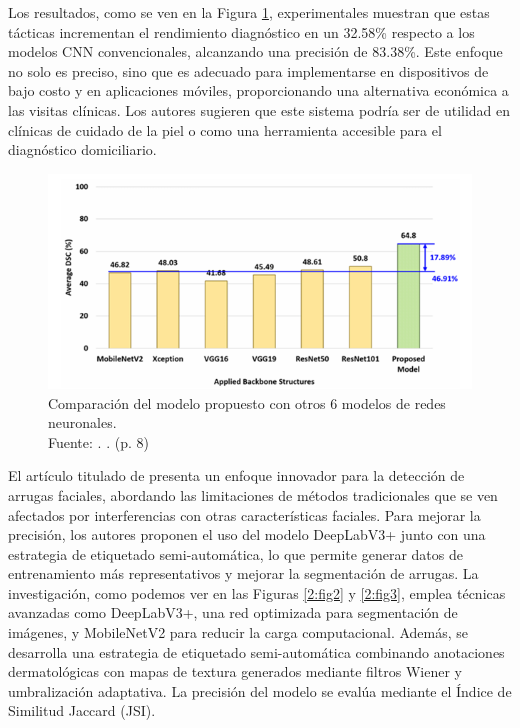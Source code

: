 Los resultados, como se ven en la Figura \ref{2:fig1}, experimentales muestran que estas tácticas incrementan el rendimiento diagnóstico en un 32.58\% respecto a los modelos CNN convencionales, alcanzando una precisión de 83.38\%. Este enfoque no solo es preciso, sino que es adecuado para implementarse en dispositivos de bajo costo y en aplicaciones móviles, proporcionando una alternativa económica a las visitas clínicas. Los autores sugieren que este sistema podría ser de utilidad en clínicas de cuidado de la piel o como una herramienta accesible para el diagnóstico domiciliario.

\begin{figure}[!ht]
	\begin{center}
		\includegraphics[width=1\textwidth]{2/figures/resultados de cuarto anteedente.png}
		\caption[Comparación del modelo propuesto con otros 6 modelos de redes neuronales]{Comparación del modelo propuesto con otros 6 modelos de redes neuronales.\\
			Fuente: \cite{Kim2023}. . (p. 8)}
		\label{2:fig1}
	\end{center}
\end{figure}


El artículo titulado  de \cite{Zhong2024} presenta un enfoque innovador para la detección de arrugas faciales, abordando las limitaciones de métodos tradicionales que se ven afectados por interferencias con otras características faciales. Para mejorar la precisión, los autores proponen el uso del modelo DeepLabV3+ junto con una estrategia de etiquetado semi-automática, lo que permite generar datos de entrenamiento más representativos y mejorar la segmentación de arrugas.
La investigación, como podemos ver en las Figuras \ref{2:fig2} y \ref{2:fig3}, emplea técnicas avanzadas como DeepLabV3+, una red optimizada para segmentación de imágenes, y MobileNetV2 para reducir la carga computacional. Además, se desarrolla una estrategia de etiquetado semi-automática combinando anotaciones dermatológicas con mapas de textura generados mediante filtros Wiener y umbralización adaptativa. La precisión del modelo se evalúa mediante el Índice de Similitud Jaccard (JSI).

